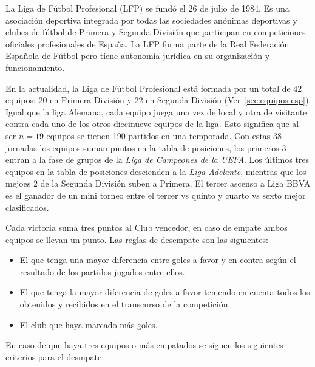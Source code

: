La Liga de Fútbol Profesional (LFP) se fundó el 26 de julio de 1984. Es una asociación deportiva integrada por todas las sociedades anónimas deportivas y clubes de fútbol de Primera y Segunda División que participan en competiciones oficiales profesionales de España. La LFP forma parte de la Real Federación Española de Fútbol pero tiene autonomía jurídica en su organización y funcionamiento. 

En la actualidad, la Liga de Fútbol Profesional está formada por un total de 42 equipos: 20 en Primera División y 22 en Segunda División (Ver~\cref{sec:equipos-esp}). Igual que la liga Alemana, cada equipo juega una vez de local y otra de visitante contra cada uno de los otros diecinueve equipos de la liga. Esto significa que al ser $n=19$ equipos se tienen 190 partidos en una temporada. Con estas 38 jornadas los equipos suman puntos en la tabla de posiciones, los primeros 3 entran a la fase de grupos de la \emph{Liga de Campeones de la UEFA}. Los últimos tres equipos en la tabla de posiciones descienden a la \emph{Liga Adelante}, mientras que los mejoes 2 de la Segunda División suben a Primera. El tercer ascenso a Liga BBVA es el ganador de un mini torneo entre el tercer vs quinto y cuarto vs sexto mejor clasificados.

Cada victoria suma tres puntos al Club vencedor, en caso de empate ambos equipos se llevan un punto. Las reglas de desempate son las siguientes: 
\begin{itemize}

	\item El que tenga una mayor diferencia entre goles a favor y en contra según el resultado de los partidos jugados entre ellos.

	\item El que tenga la mayor diferencia de goles a favor teniendo en cuenta todos los obtenidos y recibidos en el transcurso de la competición.

	\item El club que haya marcado más goles.

\end{itemize}

En caso de que haya tres equipos o más empatados se siguen los siguientes criterios para el desmpate:

